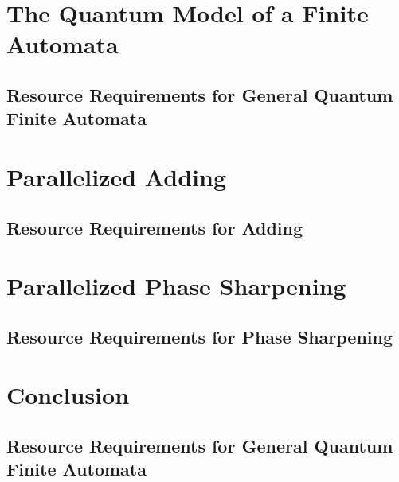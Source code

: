 \documentclass{article}
\theoremstyle{plain}
\begin{document}
\section{The Quantum Model of a Finite Automata}

\subsection{Resource Requirements for General Quantum Finite Automata}

\section{Parallelized Adding}

\subsection{Resource Requirements for Adding}

\section{Parallelized Phase Sharpening}

\subsection{Resource Requirements for Phase Sharpening}

\section{Conclusion}
\subsection{Resource Requirements for General Quantum Finite Automata}



\end{document}

